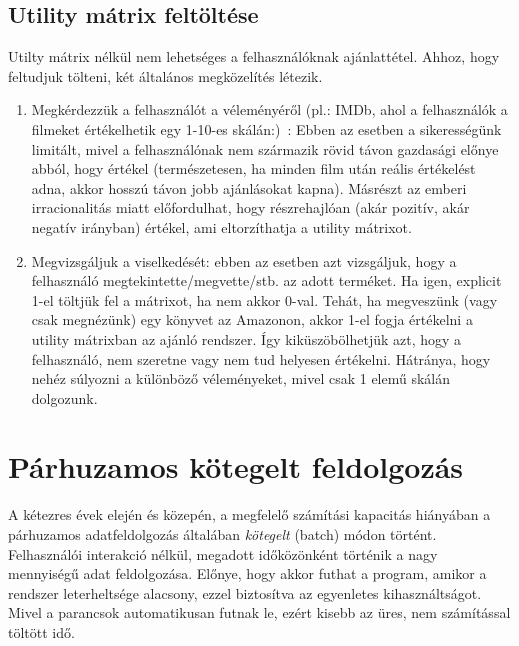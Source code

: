 \documentclass[a4paper,12pt]{article}
\begin{document}
\subsection{Utility mátrix feltöltése}
Utilty mátrix nélkül nem lehetséges a felhasználóknak ajánlattétel. Ahhoz, hogy feltudjuk tölteni, két általános megközelítés létezik.
\begin{enumerate}
\item Megkérdezzük a felhasználót a véleményéről (pl.: IMDb, ahol a felhasználók a filmeket értékelhetik egy 1-10-es skálán:)~\cite{imdb}: Ebben az esetben a sikerességünk limitált, mivel a felhasználónak nem származik rövid távon gazdasági előnye abból, hogy értékel (természetesen, ha minden film után reális értékelést adna, akkor hosszú távon jobb ajánlásokat kapna). Másrészt az emberi irracionalitás miatt előfordulhat, hogy részrehajlóan (akár pozitív, akár negatív irányban) értékel, ami eltorzíthatja a utility mátrixot. ~\cite{introspection}
\item Megvizsgáljuk a viselkedését: ebben az esetben azt vizsgáljuk, hogy a felhasználó megtekintette/megvette/stb. az adott terméket. Ha igen, explicit 1-el töltjük fel a mátrixot, ha nem akkor 0-val. Tehát, ha megveszünk (vagy csak megnézünk) egy könyvet az Amazonon, akkor 1-el fogja értékelni a utility mátrixban az ajánló rendszer. Így kiküszöbölhetjük azt, hogy a felhasználó, nem szeretne vagy nem tud helyesen értékelni. Hátránya, hogy nehéz súlyozni a különböző véleményeket, mivel csak 1 elemű skálán dolgozunk.
\end{enumerate}

\section{Párhuzamos kötegelt feldolgozás}
A kétezres évek elején és közepén, a megfelelő számítási kapacitás hiányában a párhuzamos adatfeldolgozás általában \textsl{kötegelt} (batch) módon történt. Felhasználói interakció nélkül, megadott időközönként történik a nagy mennyiségű adat feldolgozása. Előnye, hogy akkor futhat a program, amikor a rendszer leterheltsége alacsony, ezzel biztosítva az egyenletes kihasználtságot. Mivel a parancsok automatikusan futnak le, ezért kisebb az üres, nem számítással töltött idő.~\cite{batch}
\end{document}

